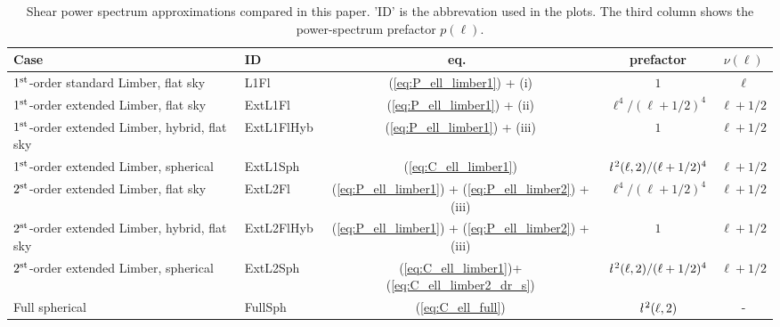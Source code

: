 \documentclass[fleqn,usenatbib]{mnras} %
\newcommand{\ellbar}{\hbox{\it \l}\,}
\begin{document}

\renewcommand{\baselinestretch}{1.5}
\begin{table}
\begin{centering}
  \label{tab:cases}
  \caption{Shear power spectrum approximations compared in this paper. 'ID' is the abbrevation used in the plots.
    The third column shows the power-spectrum prefactor $p(\ell)$. }  
    \begin{tabular}{|l|l|c|c|c}
  \hline
  Case & ID & eq.~ & prefactor & $\nu(\ell)$ \\ \hline
  $1^{\rm st}$-order standard Limber, flat sky & L1Fl & (\ref{eq:P_ell_limber1}) + (i)
    & $1$ & $\ell$ \\ \hline
  $1^{\rm st}$-order extended Limber, flat sky & ExtL1Fl & (\ref{eq:P_ell_limber1}) + (ii)
    & $\ell^4/(\ell+1/2)^4$ & $\ell + 1/2$ \\ \hline
  $1^{\rm st}$-order extended Limber, hybrid, flat sky & ExtL1FlHyb & (\ref{eq:P_ell_limber1}) + (iii)
    & $1$ & $\ell + 1/2$ \\ \hline
  $1^{\rm st}$-order extended Limber, spherical & ExtL1Sph & (\ref{eq:C_ell_limber1})
    & $\ellbar^2(\ell, 2)/(\ell+1/2)^4$ & $\ell+1/2$ \\ \hline
  $2^{\rm st}$-order extended Limber, flat sky & ExtL2Fl &  (\ref{eq:P_ell_limber1}) + (\ref{eq:P_ell_limber2}) + (iii)
    & $\ell^4/(\ell+1/2)^4$ 
    & $\ell+1/2$ \\ \hline
  $2^{\rm st}$-order extended Limber, hybrid, flat sky & ExtL2FlHyb &  (\ref{eq:P_ell_limber1}) + (\ref{eq:P_ell_limber2}) + (iii)
    & $1$ 
    & $\ell+1/2$ \\ \hline
  $2^{\rm st}$-order extended Limber, spherical & ExtL2Sph & (\ref{eq:C_ell_limber1})+(\ref{eq:C_ell_limber2_dr_s})
    & $\ellbar^2(\ell, 2)/(\ell+1/2)^4$ & $\ell+1/2$ \\ \hline
  Full spherical & FullSph & (\ref{eq:C_ell_full}) &
      $\ellbar^2(\ell, 2)$ & - \\ \hline
  \end{tabular}

\end{centering}
\end{table}
\renewcommand{\baselinestretch}{1}
\end{document}
